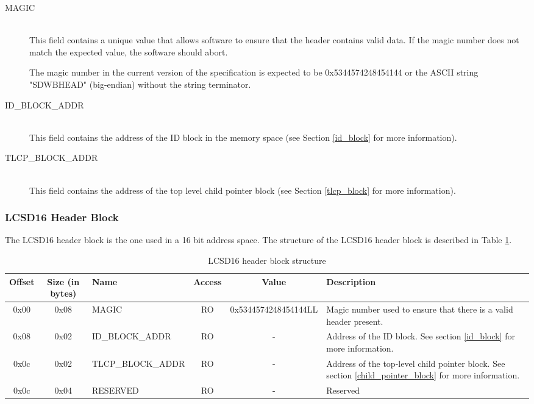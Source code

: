 \documentclass{article}
\begin{document}
\begin{description}
\item[MAGIC] \hfill \\
This field contains a unique value that allows software to ensure that
the header contains valid data. If the magic number does not match the
expected value, the software should abort.

The magic number in the current version of the specification is expected to
be 0x5344574248454144 or the ASCII string "SDWBHEAD" (big-endian) without the
string terminator.

\item[ID\_BLOCK\_ADDR] \hfill \\
This field contains the address of the ID block in the memory space (see Section
\ref{id_block} for more information).

\item[TLCP\_BLOCK\_ADDR] \hfill \\
This field contains the address of the top level child pointer block (see Section
\ref{tlcp_block} for more information).
\end{description}

\subsubsection{LCSD16 Header Block}
The LCSD16 header block is the one used in a 16 bit address space. The structure
of the LCSD16 header block is described in Table \ref{hdr_block_struct}.

\begin{center}
  \begin{savenotes}
    \begin{table}[!ht]\footnotesize
      \caption{LCSD16 header block structure}\label{hdr_block_struct}\centering
      \begin{tabular}{| c | c | l | c | c | p{5cm} |} \hline
      Offset & Size (in bytes) & Name & Access & Value & Description \\ \hline
      0x00 & 0x08 & MAGIC & RO & 0x5344574248454144LL & Magic number used to ensure that there is a valid header present. \\ \hline
      0x08 & 0x02 & ID\_BLOCK\_ADDR & RO & - & Address of the ID block. See section \ref{id_block} for more information. \\ \hline
      0x0c & 0x02 & TLCP\_BLOCK\_ADDR & RO & - & Address of the top-level child pointer block. See section \ref{child_pointer_block} for more information. \\ \hline
      0x0c & 0x04 & RESERVED & RO & - & Reserved \\ \hline
      \end{tabular}
    \end{table}
  \end{savenotes}
\end{center}
\end{document}
